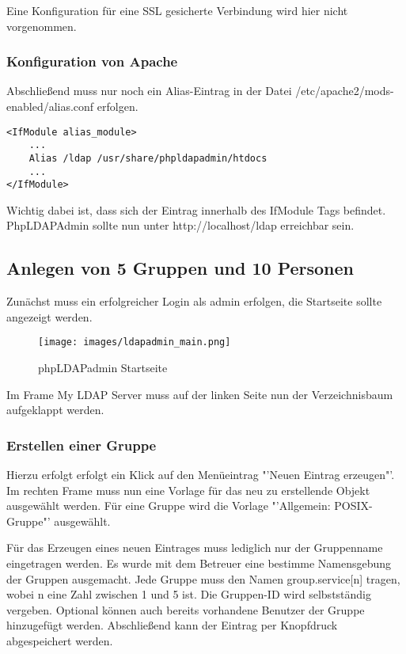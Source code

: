 Eine Konfiguration für eine SSL gesicherte Verbindung wird hier nicht vorgenommen.

\subsubsection{Konfiguration von Apache}
\label{sec:Konfiguration von Apache}
Abschließend muss nur noch ein Alias-Eintrag in der Datei /etc/apache2/mods-enabled/alias.conf erfolgen.
\begin{lstlisting}[frame=single, caption=Hinzufügen eines Alias-Eintrags]
<IfModule alias_module>
	...
	Alias /ldap /usr/share/phpldapadmin/htdocs
	...
</IfModule>
\end{lstlisting}
Wichtig dabei ist, dass sich der Eintrag innerhalb des IfModule Tags befindet.
PhpLDAPAdmin sollte nun unter http://localhost/ldap erreichbar sein.

\subsection{Anlegen von 5 Gruppen und 10 Personen}
\label{sec:Anlegen von 5 Gruppen und 10 Personen}

Zunächst muss ein erfolgreicher Login als admin erfolgen, die Startseite sollte angezeigt werden.

\begin{figure}[!h]
	\begin{center}
		\texttt{[image: images/ldapadmin\_main.png]}
		\caption{phpLDAPadmin Startseite}
		\label{ldapadmin_main}
	\end{center}
\end{figure}

Im Frame My LDAP Server muss auf der linken Seite nun der Verzeichnisbaum aufgeklappt werden.
\newpage

\subsubsection{Erstellen einer Gruppe}
\label{sec:Erstellen einer Gruppe}
Hierzu erfolgt erfolgt ein Klick auf den Menüeintrag "'Neuen Eintrag erzeugen"'. Im rechten Frame muss nun eine Vorlage für das neu zu erstellende Objekt ausgewählt werden. Für eine Gruppe wird die Vorlage "'Allgemein: POSIX-Gruppe"' ausgewählt.

Für das Erzeugen eines neuen Eintrages muss lediglich nur der Gruppenname eingetragen werden. 
Es wurde mit dem Betreuer eine bestimme Namensgebung der Gruppen ausgemacht. Jede Gruppe muss den Namen group.service[n] tragen, wobei n eine Zahl zwischen 1 und 5 ist.
Die Gruppen-ID wird selbstständig vergeben. Optional können auch bereits vorhandene Benutzer der Gruppe hinzugefügt werden. Abschließend kann der Eintrag per Knopfdruck abgespeichert werden.

